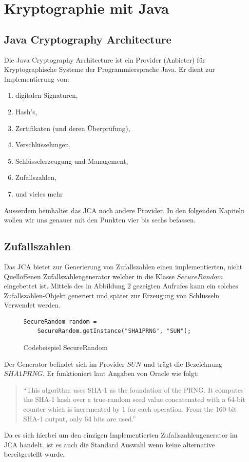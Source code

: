 \documentclass[paper=a4,11pt,german]{scrartcl} %
\begin{document}
\section{Kryptographie mit Java}

\subsection{Java Cryptography Architecture}
Die Java Cryptography Architecture ist ein Provider (Anbieter) für Kryptographische Systeme der Programmiersprache Java.
Er dient zur Implementierung von:
\begin{enumerate}
\item digitalen Signaturen,
\item Hash's,
\item Zertifikaten (und deren Überprüfung),
\item Verschlüsselungen,
\item Schlüsselerzeugung und Management,
\item Zufallszahlen,
\item und vieles mehr \cite{JCAdoc}
\end{enumerate}
Ausserdem beinhaltet das JCA noch andere Provider.
In den folgenden Kapiteln wollen wir uns genauer mit den Punkten vier bis sechs befassen. 
 
\subsection{Zufallszahlen}
Das JCA bietet zur Generierung von Zufallszahlen einen implementierten, nicht Quelloffenen Zufallszahlengenerator welcher in die Klasse
$SecureRandom$ eingebettet ist. Mittels des in Abbildung 2 gezeigten Aufrufes kann ein solches Zufallszahlen-Objekt generiert und später zur Erzeugung von Schlüsseln Verwendet werden.

\begin{figure}[hbtp]
\caption{Codebeispiel SecureRandom}
\begin{lstlisting}[frame=shadowbox]
SecureRandom random =
	SecureRandom.getInstance("SHA1PRNG", "SUN");
\end{lstlisting}
\label{KeyPairGen}
\end{figure}
Der Generator befindet sich im Provider $SUN$ und trägt die Bezeichnung $SHA1PRNG$. Er funktioniert laut Angaben von Oracle wie folgt:  
\begin{quote}
``This algorithm uses SHA-1 as the foundation of the PRNG.
It computes the SHA-1 hash over a true-random seed value
 concatenated with a 64-bit counter which is incremented 
 by 1 for each operation. From the 160-bit SHA-1 output, only 64 bits are used.'' \cite{Oracle}
\end{quote}
Da es sich hierbei um den einzigen Implementierten Zufallszahlengenerator im JCA handelt, ist es auch die Standard Auswahl wenn keine alternative bereitgestellt wurde.
\end{document}
